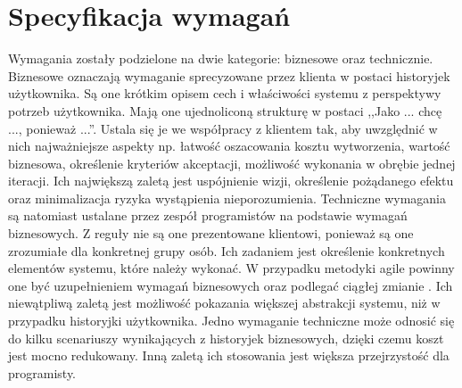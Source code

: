 \section{Specyfikacja wymagań}

Wymagania zostały podzielone na dwie kategorie: biznesowe oraz technicznie. Biznesowe oznaczają wymaganie sprecyzowane przez klienta w postaci historyjek użytkownika. Są one krótkim opisem cech i właściwości systemu z perspektywy potrzeb użytkownika. Mają one ujednoliconą strukturę w postaci ,,Jako ... chcę ..., ponieważ ...''.  Ustala się je we współpracy z klientem tak, aby uwzględnić w nich najważniejsze aspekty np. łatwość oszacowania kosztu wytworzenia, wartość biznesowa, określenie kryteriów akceptacji, możliwość wykonania w obrębie jednej iteracji. Ich największą zaletą jest uspójnienie wizji, określenie pożądanego efektu oraz minimalizacja ryzyka wystąpienia nieporozumienia. Techniczne wymagania są natomiast ustalane przez zespół programistów na podstawie wymagań biznesowych. Z reguły nie są one prezentowane klientowi, ponieważ są one zrozumiałe dla konkretnej grupy osób. Ich zadaniem jest określenie konkretnych elementów systemu, które należy wykonać. W przypadku metodyki agile powinny one być uzupełnieniem wymagań biznesowych oraz podlegać ciągłej zmianie \cite{AGI01}. Ich niewątpliwą zaletą jest możliwość pokazania większej abstrakcji systemu, niż w przypadku historyjki użytkownika. Jedno wymaganie techniczne może odnosić się do kilku scenariuszy wynikających z historyjek biznesowych, dzięki czemu koszt jest mocno redukowany. Inną zaletą ich stosowania jest większa przejrzystość dla programisty. 

\bigskip

